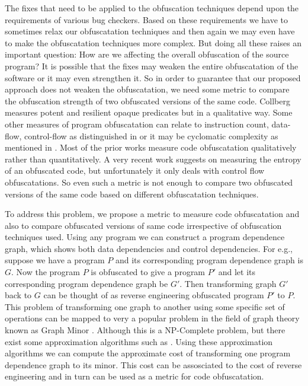 \documentclass[conference]{IEEEtran}
\begin{document}
The fixes that need to be applied to the obfuscation techniques depend upon the requirements of various bug checkers. Based on these requirements we have to sometimes relax our 
obfuscatation techniques and then again we may even have to make the obfuscatation techniques more complex. But doing all these raises an important question: How are we affecting the 
overall obfuscation of the source program? It is possible that the fixes may weaken the entire obfuscatation of the software or it may even strengthen it. So in order to guarantee that
 our proposed approach does not weaken the obfuscatation, we need some metric to compare the obfuscation strength of two obfuscated versions of the same code. Collberg \cite{collberg} 
measures potent and resilient opaque predicates but in a qualitative way. Some other measures of program obfuscatation can relate to instruction count, data-flow, control-flow as 
distinguished in \cite{sutter} or it may be cyclomatic complexity as mentioned in \cite{McCabe}. Most of the prior works measure code obfuscatation qualitatively rather than 
quantitatively. A very recent work \cite{entropy} suggests on measuring the entropy of an obfuscated code, but unfortunately it only deals with control flow obfuscatations. So even such 
a metric is not enough to compare two obfuscated versions of the same code based on different obfuscatation techniques.

To address this problem, we propose a metric to measure code obfuscatation and also to compare obfuscated versions of same code irrespective of obfuscation techniques used. Using any 
program we can construct a program dependence graph, which shows both data dependencies and control dependencies. For e.g., suppose we have a program $P$ and its corresponding program 
dependence graph is $G$. Now the program $P$ is obfuscated to give a program $P'$ and let its corresponding program dependence graph be $G'$. Then transforming graph $G'$ back to $G$ can be thought 
of as reverse engineering obfuscated program $P'$ to $P$. This problem of transforming one graph to another using some specific set of operations can be mapped to very a popular problem in 
the field of graph theory known as Graph Minor \cite{graphminor}. Although this is a NP-Complete problem, but there exist some approximation algorithms such as \cite{Demaine05}. Using 
these approximation algorithms we can compute the approximate cost of transforming one program dependence graph to its minor. This cost can be assosciated to the cost of reverse 
engineering and in turn can be used as a metric for code obfuscatation.
\end{document}
